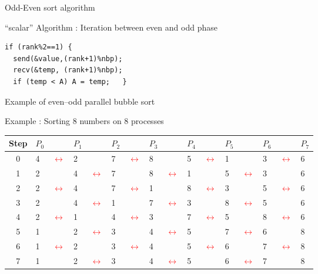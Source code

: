 \documentclass[compress,10pt,aspectratio=169]{beamer}
\begin{document}
\begin{frame}[fragile]{Odd-Even sort algorithm}
\begin{exampleblock}{\small ``scalar'' Algorithm : Iteration between even and odd phase}
\begin{itemize}
\begin{multicols}{2}
        \begin{tcolorbox}[boxsep=-1mm]
          \begin{verbatim}
if (rank%2==1) {
  send(&value,(rank+1)%nbp);
  recv(&temp, (rank+1)%nbp);
  if (temp < A) A = temp;   }
        \end{verbatim}
        \end{tcolorbox}
      \end{multicols}
    \end{itemize}
    
  \end{exampleblock}
\end{frame}

\begin{frame}[fragile]{Example of even--odd parallel bubble sort}

\alert{Example : Sorting 8 numbers on 8 processes}

{\small
\begin{tabular}{c|p{2mm}p{2mm}p{2mm}p{2mm}p{2mm}p{2mm}p{2mm}p{2mm}p{2mm}p{2mm}p{2mm}p{2mm}p{2mm}p{2mm}p{2mm}}
Step & $P_{0}$ & & $P_{1}$ & & $P_{2}$ & & $P_{3}$ & & $P_{4}$ &
     & $P_{5}$ & & $P_{6}$ & & $P_{7}$ \\ \hline
 0   & 4 & \textcolor{red}{$\leftrightarrow$} & 2 & & 7 & \textcolor{red}{$\leftrightarrow$} & 8 & 
     & 5 & \textcolor{red}{$\leftrightarrow$} & 1 & & 3 & \textcolor{red}{$\leftrightarrow$} & 6 \\
 1   & 2 & & 4 & \textcolor{red}{$\leftrightarrow$} & 7 &
     & 8 & \textcolor{red}{$\leftrightarrow$} & 1 &
     & 5 & \textcolor{red}{$\leftrightarrow$} & 3 & & 6\\
 2   & 2 & \textcolor{red}{$\leftrightarrow$} & 4 & 
     & 7 & \textcolor{red}{$\leftrightarrow$} & 1 &
     & 8 & \textcolor{red}{$\leftrightarrow$} & 3 &
     & 5 & \textcolor{red}{$\leftrightarrow$} & 6 \\
 3   & 2 & 
     & 4 & \textcolor{red}{$\leftrightarrow$} & 1 &
     & 7 & \textcolor{red}{$\leftrightarrow$} & 3 &
     & 8 & \textcolor{red}{$\leftrightarrow$} & 5 &
     & 6 \\
 4   & 2 & \textcolor{red}{$\leftrightarrow$} & 1 & 
     & 4 & \textcolor{red}{$\leftrightarrow$} & 3 &
     & 7 & \textcolor{red}{$\leftrightarrow$} & 5 &
     & 8 & \textcolor{red}{$\leftrightarrow$} & 6 \\
 5   & 1 &
     & 2 & \textcolor{red}{$\leftrightarrow$} & 3 &
     & 4 & \textcolor{red}{$\leftrightarrow$} & 5 &
     & 7 & \textcolor{red}{$\leftrightarrow$} & 6 &
     & 8 \\
 6   & 1 & \textcolor{red}{$\leftrightarrow$} & 2 &
     & 3 & \textcolor{red}{$\leftrightarrow$} & 4 &
     & 5 & \textcolor{red}{$\leftrightarrow$} & 6 &
     & 7 & \textcolor{red}{$\leftrightarrow$} & 8 \\
 7   & 1 &
     & 2 & \textcolor{red}{$\leftrightarrow$} & 3 &
     & 4 & \textcolor{red}{$\leftrightarrow$} & 5 &
     & 6 & \textcolor{red}{$\leftrightarrow$} & 7 &
     & 8
\end{tabular}
}
\end{frame}
\end{document}
